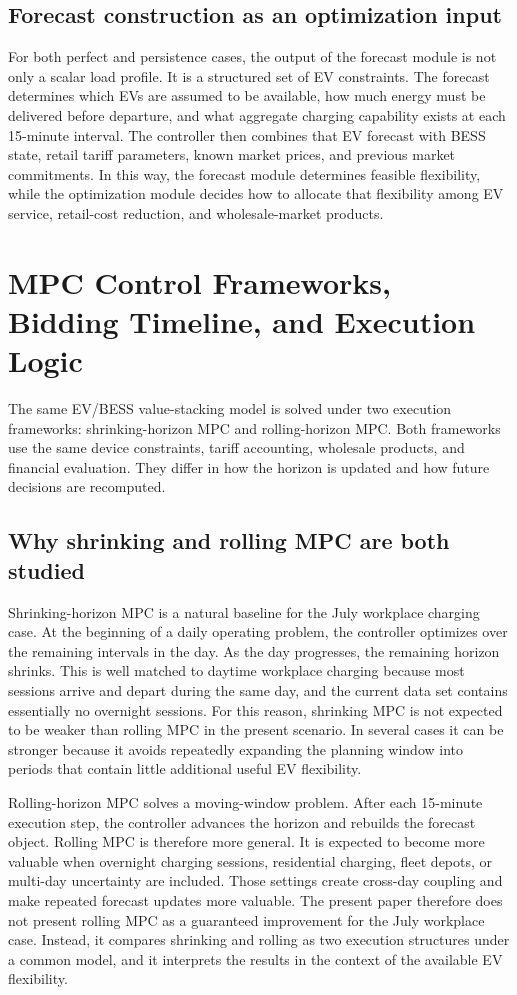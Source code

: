 \documentclass[final,5p,times]{elsarticle}
\begin{document}
\subsection{Forecast construction as an optimization input}
For both perfect and persistence cases, the output of the forecast module is not only a scalar load profile. It is a structured set of EV constraints. The forecast determines which EVs are assumed to be available, how much energy must be delivered before departure, and what aggregate charging capability exists at each 15-minute interval. The controller then combines that EV forecast with BESS state, retail tariff parameters, known market prices, and previous market commitments. In this way, the forecast module determines feasible flexibility, while the optimization module decides how to allocate that flexibility among EV service, retail-cost reduction, and wholesale-market products.
\section{MPC Control Frameworks, Bidding Timeline, and Execution Logic}
The same EV/BESS value-stacking model is solved under two execution frameworks: shrinking-horizon MPC and rolling-horizon MPC. Both frameworks use the same device constraints, tariff accounting, wholesale products, and financial evaluation. They differ in how the horizon is updated and how future decisions are recomputed.

\subsection{Why shrinking and rolling MPC are both studied}
Shrinking-horizon MPC is a natural baseline for the July workplace charging case. At the beginning of a daily operating problem, the controller optimizes over the remaining intervals in the day. As the day progresses, the remaining horizon shrinks. This is well matched to daytime workplace charging because most sessions arrive and depart during the same day, and the current data set contains essentially no overnight sessions. For this reason, shrinking MPC is not expected to be weaker than rolling MPC in the present scenario. In several cases it can be stronger because it avoids repeatedly expanding the planning window into periods that contain little additional useful EV flexibility.

Rolling-horizon MPC solves a moving-window problem. After each 15-minute execution step, the controller advances the horizon and rebuilds the forecast object. Rolling MPC is therefore more general. It is expected to become more valuable when overnight charging sessions, residential charging, fleet depots, or multi-day uncertainty are included. Those settings create cross-day coupling and make repeated forecast updates more valuable. The present paper therefore does not present rolling MPC as a guaranteed improvement for the July workplace case. Instead, it compares shrinking and rolling as two execution structures under a common model, and it interprets the results in the context of the available EV flexibility.
\end{document}
